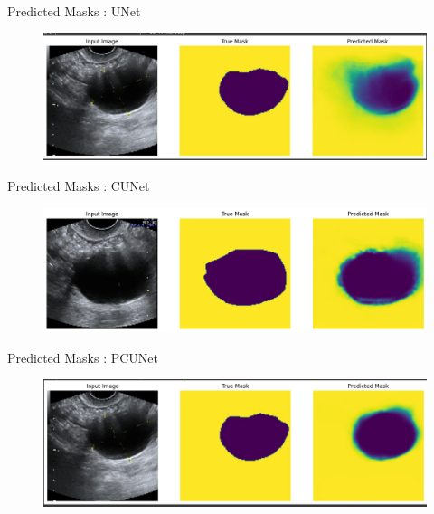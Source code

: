 \documentclass{beamer}
\begin{document}
\begin{frame}{Predicted Masks : UNet}
    \begin{figure}[H]
        \centering
        \includegraphics[width=\textwidth]{unet_output.jpeg}
    \end{figure}
\end{frame}
\begin{frame}{Predicted Masks : CUNet}
    \begin{figure}[H]
        \centering
        \includegraphics[width=\textwidth]{output_cunet.png}
    \end{figure}
\end{frame}
\begin{frame}{Predicted Masks : PCUNet}
    \begin{figure}[H]
        \centering
        \includegraphics[width=\textwidth]{pcunet_output.jpeg}
    \end{figure}
\end{frame}
\end{document}

